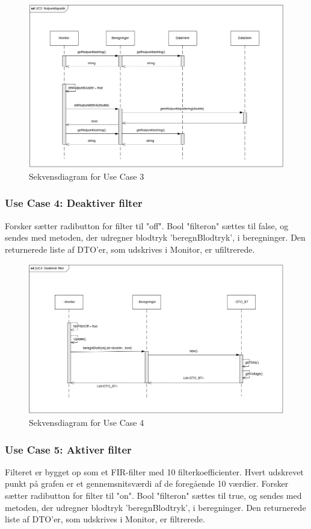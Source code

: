 \begin{figure}[H]
	\centering
	\includegraphics[width=1\textwidth]{Figurer/UC3_SD_SW}
	\caption{Sekvensdiagram for Use Case 3}
\end{figure}

\subsubsection{Use Case 4: Deaktiver filter}
Forsker sætter radibutton for filter til "off".
Bool "filteron" sættes til false, og sendes med metoden, der udregner blodtryk 'beregnBlodtryk', i beregninger. Den returnerede liste af DTO'er, som udskrives i Monitor, er ufiltrerede.

\begin{figure}[H]
	\centering
	\includegraphics[width=1\textwidth]{Figurer/UC4_SD_SW}
	\caption{Sekvensdiagram for Use Case 4}
\end{figure}

\subsubsection{Use Case 5: Aktiver filter}
Filteret er bygget op som et FIR-filter med 10 filterkoefficienter. Hvert udskrevet punkt på grafen er et gennemsnitsværdi af de foregående 10 værdier.
Forsker sætter radibutton for filter til "on".
Bool "filteron" sættes til true, og sendes med metoden, der udregner blodtryk 'beregnBlodtryk', i beregninger. Den returnerede liste af DTO'er, som udskrives i Monitor, er filtrerede.

